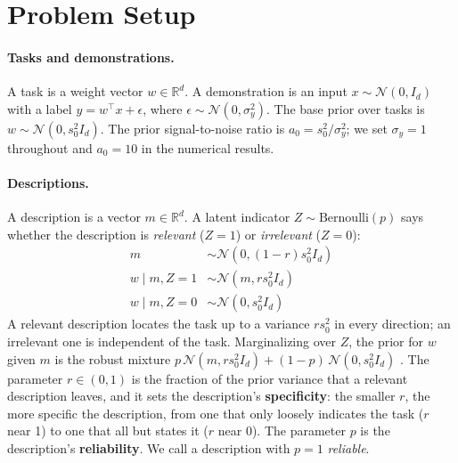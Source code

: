 \documentclass{article}
\newcommand{\R}{\mathbb{R}}
\begin{document}
\section{Problem Setup}\label{sec:setting}

\paragraph{Tasks and demonstrations.} A task is a weight vector $w \in \R^d$. A demonstration is an input $x \sim \mathcal{N}(0, I_d)$ with a label $y = w^\top x + \epsilon$, where $\epsilon \sim \mathcal{N}(0, \sigma_y^2)$. The base prior over tasks is $w \sim \mathcal{N}(0, s_0^2 I_d)$. The prior signal-to-noise ratio is $a_0 = s_0^2/\sigma_y^2$; we set $\sigma_y = 1$ throughout and $a_0 = 10$ in the numerical results.

\paragraph{Descriptions.} A description is a vector $m \in \R^d$. A latent indicator $Z \sim \mathrm{Bernoulli}(p)$ says whether the description is \emph{relevant} ($Z = 1$) or \emph{irrelevant} ($Z = 0$):
\begin{align}
    m &\sim \mathcal{N}(0, (1-r)s_0^2 I_d) \\
    w \mid m, Z=1 &\sim \mathcal{N}(m, r s_0^2 I_d) \\
    w \mid m, Z=0 &\sim \mathcal{N}(0, s_0^2 I_d)
\end{align}
A relevant description locates the task up to a variance $r s_0^2$ in every direction; an irrelevant one is independent of the task. Marginalizing over $Z$, the prior for $w$ given $m$ is the robust mixture $p\,\mathcal{N}(m, rs_0^2 I_d) + (1-p)\,\mathcal{N}(0, s_0^2 I_d)$ \citep{schmidli2014}. The parameter $r \in (0, 1)$ is the fraction of the prior variance that a relevant description leaves, and it sets the description's \textbf{specificity}: the smaller $r$, the more specific the description, from one that only loosely indicates the task ($r$ near 1) to one that all but states it ($r$ near 0). The parameter $p$ is the description's \textbf{reliability}. We call a description with $p = 1$ \emph{reliable}.
\end{document}
